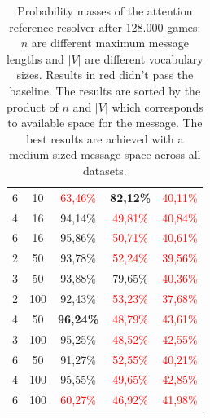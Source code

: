 \documentclass[11pt]{article}
\begin{document}
\begin{table}[ht!]
\begin{tabular}{cc|c|c|c}
    {6}                           & {10}      & \textcolor{red}{63,46\%}            & \textbf{82,12\%}                    & \textcolor{red}{40,11\%}           \\
    {4}                           & {16}      & {94,14\%}                           & \textcolor{red}{49,81\%}            & \textcolor{red}{40,84\%}           \\
    {6}                           & {16}      & {95,86\%}                           & \textcolor{red}{50,71\%}            & \textcolor{red}{40,61\%}           \\
    {2}                           & {50}      & {93,78\%}                           & \textcolor{red}{52,24\%}            & \textcolor{red}{39,56\%}           \\
    {3}                           & {50}      & {93,88\%}                           & {79,65\%}                           & \textcolor{red}{40,36\%}           \\
    {2}                           & {100}     & {92,43\%}                           & \textcolor{red}{53,23\%}            & \textcolor{red}{37,68\%}           \\
    {4}                           & {50}      & \textbf{96,24\%}                    & \textcolor{red}{48,79\%}            & \textcolor{red}{43,61\%}           \\
    {3}                           & {100}     & {95,25\%}                           & \textcolor{red}{48,52\%}            & \textcolor{red}{42,55\%}           \\
    {6}                           & {50}      & {91,27\%}                           & \textcolor{red}{52,55\%}            & \textcolor{red}{40,21\%}           \\
    {4}                           & {100}     & {95,55\%}                           & \textcolor{red}{49,65\%}            & \textcolor{red}{42,85\%}           \\
    {6}                           & {100}     & \textcolor{red}{60,27\%}            & \textcolor{red}{46,92\%}            & \textcolor{red}{41,98\%}           \\
    \bottomrule
  \end{tabular}
  \caption{Probability masses of the attention reference resolver after 128.000 games: $n$ are different maximum message lengths and $|V|$ are different vocabulary sizes. Results in red didn't pass the baseline. The results are sorted by the product of $n$ and $|V|$ which corresponds to available space for the message. The best results are achieved with a medium-sized message space across all datasets.}
  \label{tab:results:attention-reference-resolver-game}
\end{table}
\end{document}
